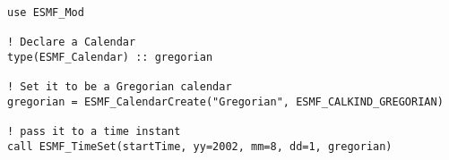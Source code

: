 
\begin{verbatim}
use ESMF_Mod

! Declare a Calendar
type(ESMF_Calendar) :: gregorian

! Set it to be a Gregorian calendar
gregorian = ESMF_CalendarCreate("Gregorian", ESMF_CALKIND_GREGORIAN)

! pass it to a time instant
call ESMF_TimeSet(startTime, yy=2002, mm=8, dd=1, gregorian)
\end{verbatim}

